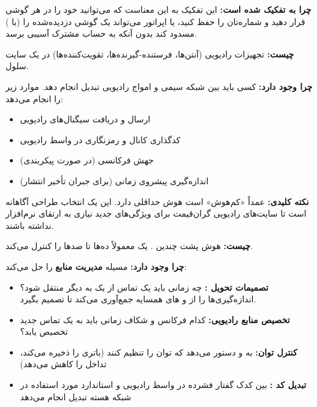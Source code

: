 \textbf{چرا به  تفکیک شده است:} این تفکیک به این معناست که می‌توانید  خود را در هر گوشی قرار دهید و شماره‌تان را حفظ کنید، یا اپراتور می‌تواند یک گوشی دزدیده‌شده را (با ) مسدود کند بدون آنکه به حساب مشترک آسیبی برسد.


\textbf{چیست:} تجهیزات رادیویی (آنتن‌ها، فرستنده-گیرنده‌ها، تقویت‌کننده‌ها) در یک سایت سلول.

\textbf{چرا وجود دارد:} کسی باید بین شبکه سیمی و امواج رادیویی تبدیل انجام دهد.  موارد زیر را انجام می‌دهد:

\begin{itemize}
\tightlist
\item
  ارسال و دریافت سیگنال‌های رادیویی
\item
  کدگذاری کانال و رمزنگاری در واسط رادیویی
\item
  جهش فرکانسی (در صورت پیکربندی)
\item
  اندازه‌گیری پیشروی زمانی (برای جبران تأخیر انتشار)
\end{itemize}

\begin{CNinsight}

\textbf{نکته کلیدی:}  عمداً «کم‌هوش» است  هوش حداقلی دارد. این یک انتخاب طراحی آگاهانه است تا سایت‌های رادیویی گران‌قیمت برای ویژگی‌های جدید نیازی به ارتقای نرم‌افزار نداشته باشند.

\end{CNinsight}


\textbf{چیست:} هوش پشت چندین . یک  معمولاً ده‌ها تا صدها  را کنترل می‌کند.

\textbf{چرا وجود دارد:}  مسیله \textbf{مدیریت منابع} را حل می‌کند:

\begin{itemize}
\tightlist
\item
  \textbf{تصمیمات تحویل :} چه زمانی باید یک تماس از یک  به  دیگر منتقل شود؟  اندازه‌گیری‌ها را از  و ‌های همسایه جمع‌آوری می‌کند تا تصمیم بگیرد.
\item
  \textbf{تخصیص منابع رادیویی:} کدام فرکانس و شکاف زمانی باید به یک تماس جدید تخصیص یابد؟
\item
  \textbf{کنترل توان:} به  و  دستور می‌دهد که توان را تنظیم کنند (باتری را ذخیره می‌کند، تداخل را کاهش می‌دهد)
\item
  \textbf{تبدیل کد :} بین کدک گفتار فشرده در واسط رادیویی  و  استاندارد  مورد استفاده در شبکه هسته تبدیل انجام می‌دهد
\end{itemize}

